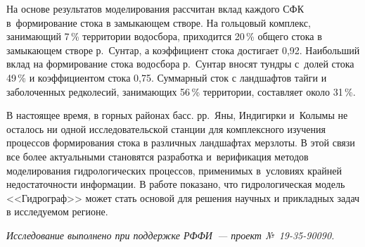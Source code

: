 

На основе результатов моделирования рассчитан вклад каждого СФК в~формирование стока в замыкающем створе. На гольцовый комплекс, занимающий 7\,\% территории водосбора, приходится 20\,\% общего стока в замыкающем створе р.~Сунтар, а коэффициент стока достигает 0,92. Наибольший вклад на формирование стока водосбора р.~Сунтар вносят тундры с~долей стока 49\,\% и коэффициентом стока 0,75. Суммарный сток с ландшафтов тайги и заболоченных редколесий, занимающих 56\,\% территории, составляет около 31\,\%.

В настоящее время, в горных районах басс. рр.~Яны, Индигирки и~Колымы не осталось ни одной исследовательской станции для комплексного изучения процессов формирования стока в различных ландшафтах мерзлоты. В этой связи все более актуальными становятся разработка и~верификация методов моделирования гидрологических процессов, применимых в~условиях крайней недостаточности информации. В работе показано, что гидрологическая модель <<Гидрограф>> может стать основой для решения научных и прикладных задач в исследуемом регионе.

\textit{Исследование выполнено при поддержке РФФИ~--- проект №~19-35-90090.}

